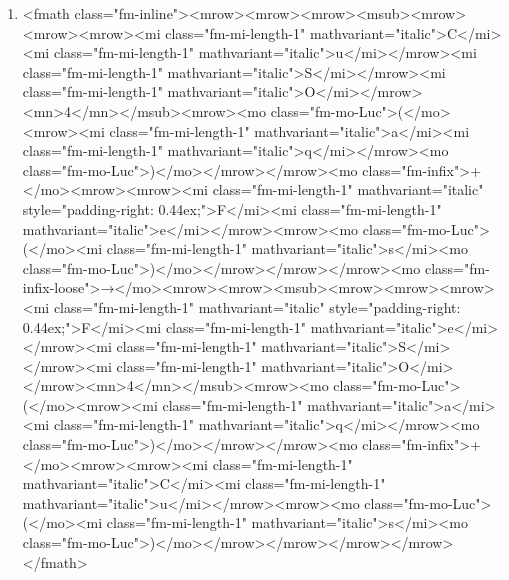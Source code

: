 \documentclass{article}
\begin{document}
\begin{enumerate}[label=(\alph*)]
\item  <fmath class="fm-inline"><mrow><mrow><mrow><msub><mrow><mrow><mrow><mi class="fm-mi-length-1" mathvariant="italic">C</mi><mi class="fm-mi-length-1" mathvariant="italic">u</mi></mrow><mi class="fm-mi-length-1" mathvariant="italic">S</mi></mrow><mi class="fm-mi-length-1" mathvariant="italic">O</mi></mrow><mn>4</mn></msub><mrow><mo class="fm-mo-Luc">(</mo><mrow><mi class="fm-mi-length-1" mathvariant="italic">a</mi><mi class="fm-mi-length-1" mathvariant="italic">q</mi></mrow><mo class="fm-mo-Luc">)</mo></mrow></mrow><mo class="fm-infix">+</mo><mrow><mrow><mi class="fm-mi-length-1" mathvariant="italic" style="padding-right: 0.44ex;">F</mi><mi class="fm-mi-length-1" mathvariant="italic">e</mi></mrow><mrow><mo class="fm-mo-Luc">(</mo><mi class="fm-mi-length-1" mathvariant="italic">s</mi><mo class="fm-mo-Luc">)</mo></mrow></mrow></mrow><mo class="fm-infix-loose">→</mo><mrow><mrow><msub><mrow><mrow><mrow><mi class="fm-mi-length-1" mathvariant="italic" style="padding-right: 0.44ex;">F</mi><mi class="fm-mi-length-1" mathvariant="italic">e</mi></mrow><mi class="fm-mi-length-1" mathvariant="italic">S</mi></mrow><mi class="fm-mi-length-1" mathvariant="italic">O</mi></mrow><mn>4</mn></msub><mrow><mo class="fm-mo-Luc">(</mo><mrow><mi class="fm-mi-length-1" mathvariant="italic">a</mi><mi class="fm-mi-length-1" mathvariant="italic">q</mi></mrow><mo class="fm-mo-Luc">)</mo></mrow></mrow><mo class="fm-infix">+</mo><mrow><mrow><mi class="fm-mi-length-1" mathvariant="italic">C</mi><mi class="fm-mi-length-1" mathvariant="italic">u</mi></mrow><mrow><mo class="fm-mo-Luc">(</mo><mi class="fm-mi-length-1" mathvariant="italic">s</mi><mo class="fm-mo-Luc">)</mo></mrow></mrow></mrow></mrow></fmath> 

\end{enumerate}
\end{document}
